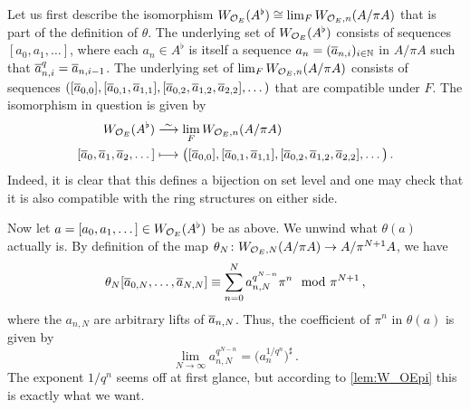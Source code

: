 \documentclass[a4paper, 10pt, oneside, DIV=9, chapterprefix=true, numbers=enddot,bibliography=totoc]{scrbook}
\begin{document}
\begin{proof*}
	Let us first describe the isomorphism $W_{\mathcal{O}_E}(A^\flat)\cong \lim_FW_{\mathcal{O}_E,n}(A/\pi A)$ that is part of the definition of $\theta$. The underlying set of $W_{\mathcal{O}_E}(A^\flat)$ consists of sequences $[a_0,a_1,\dotsc]$, where each $a_n\in A^\flat$ is itself a sequence $a_n=(\ov{a}_{n,i})_{i\in\IN}$ in $A/\pi A$ such that $\ov{a}_{n,i}^q=\ov{a}_{n,i-1}$. The underlying set of $\lim_FW_{\mathcal{O}_E,n}(A/\pi A)$ consists of sequences $([\ov{a}_{0,0}],[\ov{a}_{0,1},\ov{a}_{1,1}],[\ov{a}_{0,2},\ov{a}_{1,2},\ov{a}_{2,2}],\dotsc)$ that are compatible under $F$. The isomorphism in question is given by
	\begin{align*}
		W_{\Oo_E}(A^\flat)&\isomorphism\lim_FW_{\Oo_E,n}(A/\pi A)\\
		[\ov{a}_0,\ov{a}_1,\ov{a}_2,\dotsc]&\longmapsto \big([\ov{a}_{0,0}],[\ov{a}_{0,1},\ov{a}_{1,1}],[\ov{a}_{0,2},\ov{a}_{1,2},\ov{a}_{2,2}],\dotsc\big)\,.
	\end{align*}
	Indeed, it is clear that this defines a bijection on set level and one may check that it is also compatible with the ring structures on either side.
	
	Now let $a=[a_0,a_1,\dotsc]\in W_{\mathcal{O}_E}(A^\flat)$ be as above. We unwind what $\theta(a)$ actually is. By definition of the map $\theta_N\colon W_{\Oo_E,N}(A/\pi A)\morphism A/\pi^{N+1}A$, we have
	\begin{equation*}
		\theta_N[\ov{a}_{0,N},\dotsc,\ov{a}_{N,N}]\equiv\sum_{n=0}^Na_{n,N}^{q^{N-n}}\pi^n\mod \pi^{N+1}\,,
	\end{equation*}
	where the $a_{n,N}$ are arbitrary lifts of $\ov{a}_{n,N}$. 
	Thus, the coefficient of $\pi^n$ in $\theta(a)$ is given by
	\begin{equation*}
		\lim_{N\to\infty}a_{n,N}^{q^{N-n}}=\big(a_n^{1/q^n}\big)^\sharp\,.
	\end{equation*}
	The exponent $1/q^n$ seems off at first glance, but according to \cref{lem:W_OEpi} this is exactly what we want.
\end{proof*}
\end{document}
